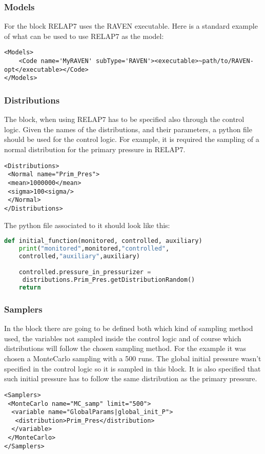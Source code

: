 \subsubsection{Models}
For the  block RELAP7 uses the RAVEN executable.
%
Here is a standard example of what can be used to use RELAP7 as the model:
\begin{lstlisting}[style=XML]
<Models>
    <Code name='MyRAVEN' subType='RAVEN'><executable>~path/to/RAVEN-opt</executable></Code>
</Models>
\end{lstlisting}
\subsubsection{Distributions}
The  block, when using RELAP7 has to be specified also through
the control logic.
%
Given the names of the distributions, and their parameters, a python file should
be used for the control logic.
%
For example, it is required the sampling of a normal distribution for the
primary pressure in RELAP7.
%
\begin{lstlisting}[style=XML]
<Distributions>
 <Normal name="Prim_Pres">
 <mean>1000000</mean>
 <sigma>100<sigma/>
 </Normal>
</Distributions>
\end{lstlisting}
The python file associated to it should look like this:
\begin{lstlisting}[language=Python]
def initial_function(monitored, controlled, auxiliary)
    print("monitored",monitored,"controlled",
    controlled,"auxiliary",auxiliary)

    controlled.pressure_in_pressurizer =
     distributions.Prim_Pres.getDistributionRandom()
    return
\end{lstlisting}
\subsubsection{Samplers}
In the  block there are going to be defined both which kind of
sampling method used, the variables not sampled inside the control logic and of
course which distributions will follow the chosen sampling method.
%
For the example it was chosen a MonteCarlo sampling with a 500 runs.
%
The global initial pressure wasn't specified in the control logic so it is
sampled in this block.
%
It is also specified that such initial pressure has to follow the same
distribution as the primary pressure.
%
\begin{lstlisting}[style=XML]
<Samplers>
 <MonteCarlo name="MC_samp" limit="500">
  <variable name="GlobalParams|global_init_P">
   <distribution>Prim_Pres</distribution>
  </variable>
 </MonteCarlo>
</Samplers>
\end{lstlisting}

